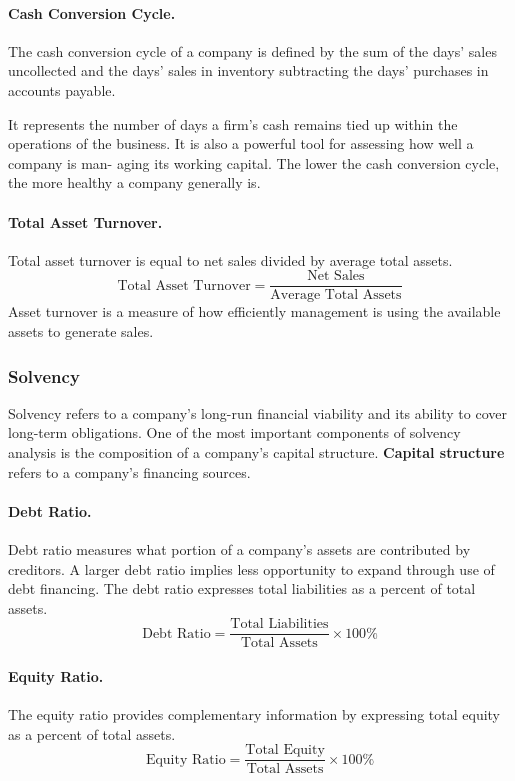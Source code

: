 \documentclass[../main.tex]{subfiles}
\begin{document}
	\paragraph{Cash Conversion Cycle.} The cash conversion cycle of a company 
	is defined by the sum of the days’ sales uncollected and the days’ sales in 
	inventory subtracting the days’ purchases in accounts payable.
	
	It represents the number of days a firm’s cash remains tied up within the 
	operations of the business. It is also a powerful tool for assessing how 
	well a company is man- aging its working capital. The lower the cash 
	conversion cycle, the more healthy a company generally is.
	
	\paragraph{Total Asset Turnover.} Total asset turnover is equal to net 
	sales divided by average total assets.
	\[
	\text{Total Asset Turnover} = \frac{\text{Net Sales}}{\text{Average Total 
	Assets}}
	\]
	Asset turnover is a measure of how efficiently management is using the 
	available assets to generate sales.
	
	\subsubsection{Solvency}
	
	Solvency refers to a company’s long-run financial viability and its ability 
	to cover long-term obligations. One of the most important components of 
	solvency analysis is the composition of a company’s capital structure. 
	\textbf{Capital structure} refers to a company’s financing sources.
	
	\paragraph{Debt Ratio.} Debt ratio measures what portion of a company’s 
	assets are contributed by creditors. A larger debt ratio implies less 
	opportunity to expand through use of debt financing. The debt ratio 
	expresses total liabilities as a percent of total assets. 
	\[
	\text{Debt Ratio} = \frac{\text{Total Liabilities}}{\text{Total Assets}} 
	\times 100\%
	\]
	
	\paragraph{Equity Ratio.} The equity ratio provides complementary 
	information by expressing total equity as a percent of total assets.
	\[
	\text{Equity Ratio} = \frac{\text{Total Equity}}{\text{Total Assets}} 
	\times 100\%
	\]
	
\end{document}
